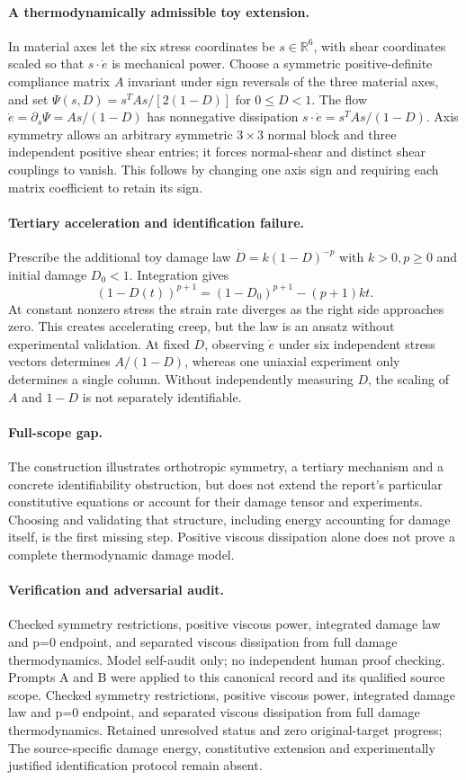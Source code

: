 \documentclass[11pt]{article}
\begin{document}
\paragraph{A thermodynamically admissible toy extension.} In material axes let the six stress coordinates be $s\in\mathbb R^6$, with shear coordinates scaled so that $s\cdot\dot e$ is mechanical power. Choose a symmetric positive-definite compliance matrix $A$ invariant under sign reversals of the three material axes, and set $\Psi(s,D)=s^TAs/[2(1-D)]$ for $0\leq D<1$. The flow $\dot e=\partial_s\Psi=As/(1-D)$ has nonnegative dissipation $s\cdot\dot e=s^TAs/(1-D)$. Axis symmetry allows an arbitrary symmetric $3\times3$ normal block and three independent positive shear entries; it forces normal-shear and distinct shear couplings to vanish. This follows by changing one axis sign and requiring each matrix coefficient to retain its sign.

\paragraph{Tertiary acceleration and identification failure.} Prescribe the additional toy damage law $\dot D=k(1-D)^{-p}$ with $k>0,p\geq0$ and initial damage $D_0<1$. Integration gives
\[
 (1-D(t))^{p+1}=(1-D_0)^{p+1}-(p+1)kt.
\]
At constant nonzero stress the strain rate diverges as the right side approaches zero. This creates accelerating creep, but the law is an ansatz without experimental validation. At fixed $D$, observing $\dot e$ under six independent stress vectors determines $A/(1-D)$, whereas one uniaxial experiment only determines a single column. Without independently measuring $D$, the scaling of $A$ and $1-D$ is not separately identifiable.

\paragraph{Full-scope gap.} The construction illustrates orthotropic symmetry, a tertiary mechanism and a concrete identifiability obstruction, but does not extend the report's particular constitutive equations or account for their damage tensor and experiments. Choosing and validating that structure, including energy accounting for damage itself, is the first missing step. Positive viscous dissipation alone does not prove a complete thermodynamic damage model.

\paragraph{Verification and adversarial audit.}
Checked symmetry restrictions, positive viscous power, integrated damage law and p=0 endpoint, and separated viscous dissipation from full damage thermodynamics. Model self-audit only; no independent human proof checking. Prompts A and B were applied to this canonical record and its qualified source scope. Checked symmetry restrictions, positive viscous power, integrated damage law and p=0 endpoint, and separated viscous dissipation from full damage thermodynamics. Retained unresolved status and zero original-target progress; The source-specific damage energy, constitutive extension and experimentally justified identification protocol remain absent.
\end{document}
